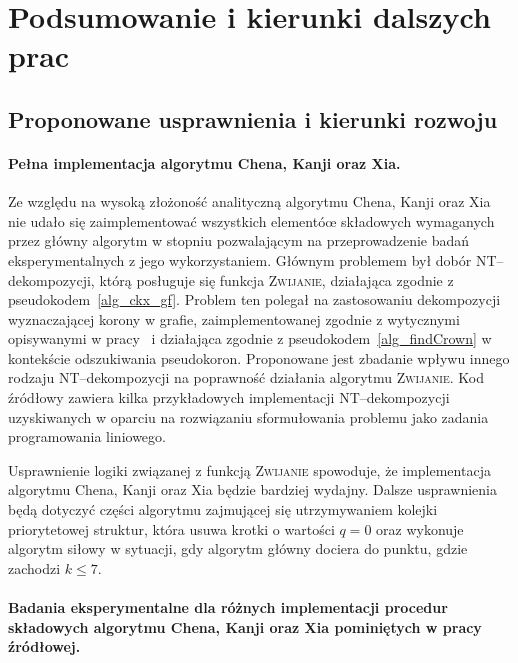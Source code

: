 \chapter{Podsumowanie i kierunki dalszych prac}
\label{summary}
\section*{Proponowane usprawnienia i kierunki rozwoju}\label{s_improvements}
\addtocounter{section}{1}
  \subsubsection{\textbf{Pełna implementacja algorytmu Chena, Kanji oraz Xia.}}\label{sss_problems_ckx}

  Ze względu na wysoką złożoność analityczną algorytmu Chena, Kanji oraz Xia nie udało się zaimplementować wszystkich elementóœ składowych wymaganych przez główny algorytm w stopniu pozwalającym na przeprowadzenie badań eksperymentalnych z jego wykorzystaniem.
  Głównym problemem był dobór NT--dekompozycji, którą posługuje się funkcja \textsc{Zwijanie}, działająca zgodnie z pseudokodem~\ref{alg_ckx_gf}.
  Problem ten polegał na zastosowaniu dekompozycji wyznaczającej korony w grafie, zaimplementowanej zgodnie z wytycznymi opisywanymi w pracy~\cite{KernelizationAlgorithms04} i działająca zgodnie z pseudokodem~\ref{alg_findCrown} w kontekście odszukiwania pseudokoron.
  Proponowane jest zbadanie wpływu innego rodzaju NT--dekompozycji na poprawność działania algorytmu \textsc{Zwijanie}.
  Kod źródłowy zawiera kilka przykładowych implementacji NT--dekompozycji uzyskiwanych w oparciu na rozwiązaniu sformułowania problemu jako zadania programowania liniowego.

  Usprawnienie logiki związanej z funkcją \textsc{Zwijanie} spowoduje, że implementacja algorytmu Chena, Kanji oraz Xia będzie bardziej wydajny.
  Dalsze usprawnienia będą dotyczyć części algorytmu zajmującej się utrzymywaniem kolejki priorytetowej struktur, która usuwa krotki o wartości $q = 0$ oraz wykonuje algorytm siłowy w sytuacji, gdy algorytm główny dociera do punktu, gdzie zachodzi $k \leq 7$.

  \subsubsection{\textbf{Badania eksperymentalne dla różnych implementacji procedur składowych algorytmu Chena, Kanji oraz Xia pominiętych w pracy źródłowej.}}

